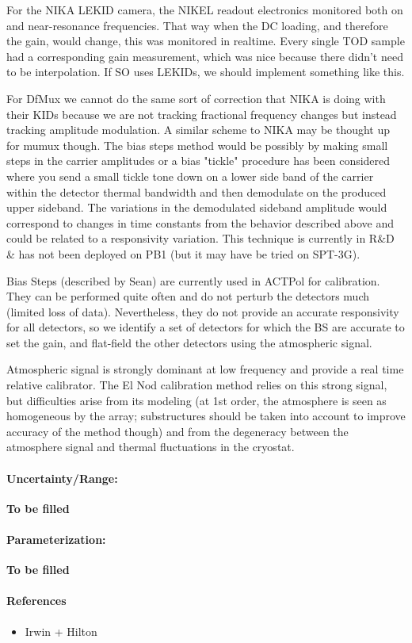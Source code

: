 For the NIKA LEKID camera, the NIKEL readout electronics monitored both on and near-resonance frequencies. That way when the DC loading, and therefore the gain, would change, this was monitored in realtime. Every single TOD sample had a corresponding gain measurement, which was nice because there didn't need to be interpolation. If SO uses LEKIDs, we should implement something like this. 

For DfMux we cannot do the same sort of correction that NIKA is doing with their KIDs because we are not tracking fractional frequency changes but instead tracking amplitude modulation. A similar scheme to NIKA may be thought up for mumux though. The bias steps method would be possibly by making small steps in the carrier amplitudes or a bias "tickle" procedure has been considered where you send a small tickle tone down on a lower side band of the carrier within the detector thermal bandwidth and then demodulate on the produced upper sideband. The variations in the demodulated sideband amplitude would correspond to changes in time constants from the behavior described above and could be related to a responsivity variation. This technique is currently in R\&D \& has not been deployed on PB1 (but it may have be tried on SPT-3G).

Bias Steps (described by Sean) are currently used in ACTPol for calibration. They can be performed quite often and do not perturb the detectors much (limited loss of data). Nevertheless, they do not provide an accurate responsivity for all detectors, so we identify a set of detectors for which the BS are accurate to set the gain, and flat-field the other detectors using the atmospheric signal.

Atmospheric signal is strongly dominant at low frequency and provide a real time relative calibrator. The El Nod calibration method relies on this strong signal, but difficulties arise from its modeling (at 1st order, the atmosphere is seen as homogeneous by the array; substructures should be taken into account to improve accuracy of the method though) and from the degeneracy between the atmosphere signal and thermal fluctuations in the cryostat.


\paragraph{Uncertainty/Range:}
\textbf{To be filled}
\paragraph{Parameterization:}
\textbf{To be filled}

\paragraph{References}
\begin{itemize}
\item Irwin + Hilton
\end{itemize} 

